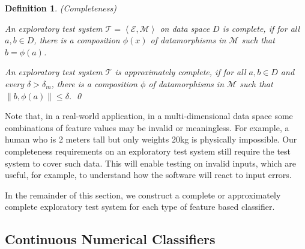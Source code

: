 \documentclass[preprint,1p,authoryear,times]{elsarticle}
\newtheorem{Definition}{Definition}
\begin{document}
%
%

\begin{Definition}\label{def:Completeness}(Completeness)

An exploratory test system $\mathscr{T} = \left< \mathscr{E}, \mathscr{M}\right>$ on data space $D$ is \emph{complete}, if for all $a, b \in D$, there is a composition $\phi(x)$ of datamorphisms in $\mathscr{M}$ such that $b = \phi(a)$. 

An exploratory test system $\mathscr{T}$ is \emph{approximately complete}, if for all $a, b \in D$ and every $\delta > \delta_m$, there is a composition $\phi$ of datamorphisms in $\mathscr{M}$ such that $\|b, \phi(a)\| \leq \delta$. \qed
\end{Definition}

Note that, in a real-world application, in a multi-dimensional data space some combinations of feature values may be invalid or meaningless. For example, a human who is 2 meters tall but only weights 20kg is physically impossible. Our completeness requirements on an exploratory test system still require the test system to cover such data. This will enable testing on invalid inputs, which are useful, for example, to understand how the software will react to input errors. 

In the remainder of this section, we construct a complete or approximately complete exploratory test system for each type of feature based classifier.


\subsection{Continuous Numerical Classifiers}\label{sec:ConituousNumericalClassifier}
\end{document}

